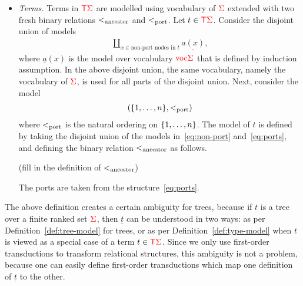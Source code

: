\begin{definition}
\begin{itemize}
                
        \item \emph{Terms.}  Terms in ${\color{red}{\mathsf T}} {\color{red}{\Sigma}}$ are modelled using vocabulary of ${\color{red}{\Sigma}}$ extended with two fresh binary relations $<_{\mathrm{ancestor}}$ and $<_{\mathrm{port}}$. 
          Let $t \in {\color{red}{\mathsf T}} {\color{red}{\Sigma}}$. Consider the disjoint union of models
            \begin{align}\label{eq:non-port}
                 \coprod_{x \in \text{non-port nodes in $t$}} \underline{a(x)},
            \end{align}
         where  $\underline a(x)$ is the model over vocabulary ${\color{red}{\mathrm{voc}}}{\color{red}{\Sigma}}$ that  is defined by induction assumption.   In the above  disjoint union, the same vocabulary, namely the vocabulary of ${\color{red}{\Sigma}}$,  is used  for all parts of the disjoint union. Next, consider  the model
            \begin{align}\label{eq:ports}
            (\{1,\ldots,n\}, <_{\mathrm{port}})
            \end{align}
            where $<_{\mathrm{port}}$ is the natural ordering on $\{1,\ldots,n\}$. 
            The model of $t$ is defined by taking the disjoint union of the models in~\eqref{eq:non-port} and~\eqref{eq:ports}, and defining the binary relation $<_{\mathrm{ancestor}}$ as follows.
            \begin{center}
                (fill in the definition of $<_{\mathrm{ancestor}}$)
            \end{center}
            The ports are taken from the structure~\eqref{eq:ports}.
    \end{itemize}
\end{definition}

The above  definition creates a certain ambiguity for trees, because if $t$ is a tree over a finite ranked set ${\color{red}{\Sigma}}$, then $\underline t$ can be understood in two ways: as per  Definition~\ref{def:tree-model} for trees, or as per Definition~\ref{def:type-model} when $t$ is viewed as a special case of a term $t \in {\color{red}{\mathsf T}} {\color{red}{\Sigma}}$. Since we only use first-order transductions to transform relational structures,  this ambiguity is not a problem, because one can easily define first-order transductions which map one definition of $\underline t$ to the other.

